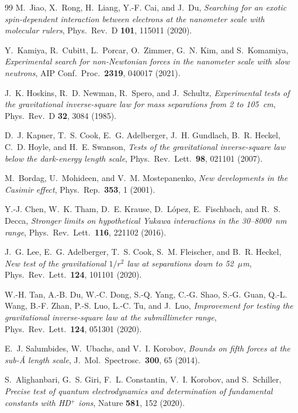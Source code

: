 \documentclass[12pt,a4paper]{report}
\begin{document}
\begin{thebibliography}{99}
M.~Jiao, X.~Rong, H.~Liang, Y.-F. Cai, and J.~Du,
\textit{Searching for an exotic spin-dependent interaction between
electrons at the nanometer scale with molecular rulers},
Phys.\ Rev.\ D \textbf{101}, 115011 (2020).

Y.~Kamiya, R.~Cubitt, L.~Porcar, O.~Zimmer, G.~N. Kim, and S.~Komamiya,
\textit{Experimental search for non-Newtonian forces in the nanometer
scale with slow neutrons},
AIP Conf.\ Proc.\ \textbf{2319}, 040017 (2021).

J.~K. Hoskins, R.~D. Newman, R.~Spero, and J.~Schultz,
\textit{Experimental tests of the gravitational inverse-square law for
mass separations from 2 to 105~cm},
Phys.\ Rev.\ D \textbf{32}, 3084 (1985).

D.~J. Kapner, T.~S. Cook, E.~G. Adelberger, J.~H. Gundlach, B.~R. Heckel,
C.~D. Hoyle, and H.~E. Swanson,
\textit{Tests of the gravitational inverse-square law below the
dark-energy length scale},
Phys.\ Rev.\ Lett.\ \textbf{98}, 021101 (2007).

M.~Bordag, U.~Mohideen, and V.~M. Mostepanenko,
\textit{New developments in the Casimir effect},
Phys.\ Rep.\ \textbf{353}, 1 (2001).

Y.-J. Chen, W.~K. Tham, D.~E. Krause, D.~L\'{o}pez, E.~Fischbach, and
R.~S. Decca,
\textit{Stronger limits on hypothetical Yukawa interactions in the
30--8000~nm range},
Phys.\ Rev.\ Lett.\ \textbf{116}, 221102 (2016).

J.~G. Lee, E.~G. Adelberger, T.~S. Cook, S.~M. Fleischer, and B.~R. Heckel,
\textit{New test of the gravitational $1/r^2$ law at separations down to
52~$\mu$m},
Phys.\ Rev.\ Lett.\ \textbf{124}, 101101 (2020).

W.-H. Tan, A.-B. Du, W.-C. Dong, S.-Q. Yang, C.-G. Shao, S.-G. Guan,
Q.-L. Wang, B.-F. Zhan, P.-S. Luo, L.-C. Tu, and J.~Luo,
\textit{Improvement for testing the gravitational inverse-square law at
the submillimeter range},
Phys.\ Rev.\ Lett.\ \textbf{124}, 051301 (2020).

E.~J. Salumbides, W.~Ubachs, and V.~I. Korobov,
\textit{Bounds on fifth forces at the sub-\AA{} length scale},
J.\ Mol.\ Spectrosc.\ \textbf{300}, 65 (2014).

S.~Alighanbari, G.~S. Giri, F.~L. Constantin, V.~I. Korobov, and
S.~Schiller,
\textit{Precise test of quantum electrodynamics and determination of
fundamental constants with HD$^+$ ions},
Nature \textbf{581}, 152 (2020).


\end{thebibliography}
\end{document}
